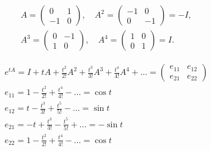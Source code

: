 \begin{exmp}
    \begin{gather*}
        A = \left( \begin{matrix}
            0 & 1 \\
            -1 & 0
        \end{matrix} \right), \quad
        A^2 = \left( \begin{matrix}
            -1 & 0 \\
            0 & -1
        \end{matrix} \right) = -I, \\
        A^3 = \left( \begin{matrix}
            0 & -1 \\
            1 & 0
        \end{matrix} \right), \quad
        A^4 = \left( \begin{matrix}
            1 & 0 \\
            0 & 1
        \end{matrix} \right) = I.
    \end{gather*}

    \begin{gather*}
        e^{tA} = I + tA + \frac{t^2}{2!} A^2 + \frac{t^3}{3!} A^3 + \frac{t^4}{4!} A^4 + \ldots = \left( \begin{matrix}
            e_{11} & e_{12} \\
            e_{21} & e_{22}
        \end{matrix} \right) \\
        e_{11} = 1 - \frac{t^2}{2!} + \frac{t^4}{4!} - \ldots = \cos t \\
        e_{12} = t - \frac{t^3}{3!} + \frac{t^5}{5!} - \ldots = \sin t \\
        e_{21} = -t + \frac{t^3}{3!} - \frac{t^5}{5!} + \ldots = -\sin t \\
        e_{22} = 1 - \frac{t^2}{2!} + \frac{t^4}{4!} - \ldots = \cos t \\
    \end{gather*}
\end{exmp}
